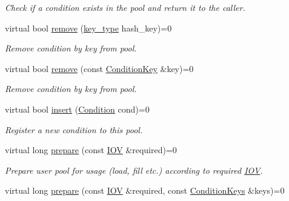 \begin{DoxyCompactItemize}
\begin{DoxyCompactList}\small\item\em Check if a condition exists in the pool and return it to the caller. \item\end{DoxyCompactList}\item 
virtual bool \hyperlink{class_d_d4hep_1_1_conditions_1_1_user_pool_aeab574005dcfb99f8147b87d220f65f1}{remove} (\hyperlink{class_d_d4hep_1_1_conditions_1_1_user_pool_aa256cf1e22de1b9f2a84d39309b8bfa9}{key\_\-type} hash\_\-key)=0
\begin{DoxyCompactList}\small\item\em Remove condition by key from pool. \item\end{DoxyCompactList}\item 
virtual bool \hyperlink{class_d_d4hep_1_1_conditions_1_1_user_pool_ac8f9ef22b7ec455e7ab56d05dc43af77}{remove} (const \hyperlink{class_d_d4hep_1_1_conditions_1_1_condition_key}{ConditionKey} \&key)=0
\begin{DoxyCompactList}\small\item\em Remove condition by key from pool. \item\end{DoxyCompactList}\item 
virtual bool \hyperlink{class_d_d4hep_1_1_conditions_1_1_user_pool_af25760694df2897b8998fcf65ced5a18}{insert} (\hyperlink{class_d_d4hep_1_1_conditions_1_1_condition}{Condition} cond)=0
\begin{DoxyCompactList}\small\item\em Register a new condition to this pool. \item\end{DoxyCompactList}\item 
virtual long \hyperlink{class_d_d4hep_1_1_conditions_1_1_user_pool_aebbb5c871d30372eb33955aef9bfcaf0}{prepare} (const \hyperlink{class_d_d4hep_1_1_i_o_v}{IOV} \&required)=0
\begin{DoxyCompactList}\small\item\em Prepare user pool for usage (load, fill etc.) according to required \hyperlink{class_d_d4hep_1_1_i_o_v}{IOV}. \item\end{DoxyCompactList}\item 
virtual long \hyperlink{class_d_d4hep_1_1_conditions_1_1_user_pool_a91ce4579b205b59ef3012b8b97013abf}{prepare} (const \hyperlink{class_d_d4hep_1_1_i_o_v}{IOV} \&required, const \hyperlink{class_d_d4hep_1_1_conditions_1_1_user_pool_a6282d01af77401a4c20f08391d18cc95}{ConditionKeys} \&keys)=0

\end{DoxyCompactItemize}
